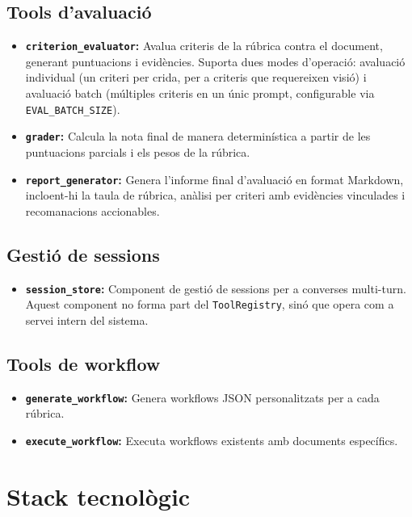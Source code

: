 \documentclass[12pt,a4paper,twoside]{report}
\begin{document}
\subsection{Tools d'avaluaci\'o}

\begin{itemize}
    \item \textbf{\texttt{criterion\_evaluator}:} Avalua criteris de la r\'ubrica contra el document, generant puntuacions i evid\`encies. Suporta dues modes d'operaci\'o: avaluaci\'o individual (un criteri per crida, per a criteris que requereixen visi\'o) i avaluaci\'o batch (m\'ultiples criteris en un \'unic prompt, configurable via \texttt{EVAL\_BATCH\_SIZE}).
    \item \textbf{\texttt{grader}:} Calcula la nota final de manera determin\'istica a partir de les puntuacions parcials i els pesos de la r\'ubrica.
    \item \textbf{\texttt{report\_generator}:} Genera l'informe final d'avaluaci\'o en format Markdown, incloent-hi la taula de r\'ubrica, an\`alisi per criteri amb evid\`encies vinculades i recomanacions accionables.
\end{itemize}

\subsection{Gesti\'o de sessions}

\begin{itemize}
    \item \textbf{\texttt{session\_store}:} Component de gesti\'o de sessions per a converses multi-turn. Aquest component no forma part del \texttt{ToolRegistry}, sin\'o que opera com a servei intern del sistema.
\end{itemize}

\subsection{Tools de workflow}

\begin{itemize}
    \item \textbf{\texttt{generate\_workflow}:} Genera workflows JSON personalitzats per a cada r\'ubrica.
    \item \textbf{\texttt{execute\_workflow}:} Executa workflows existents amb documents espec\'ifics.
\end{itemize}

\section{Stack tecnol\`ogic}
\label{sec:stack}
\end{document}
